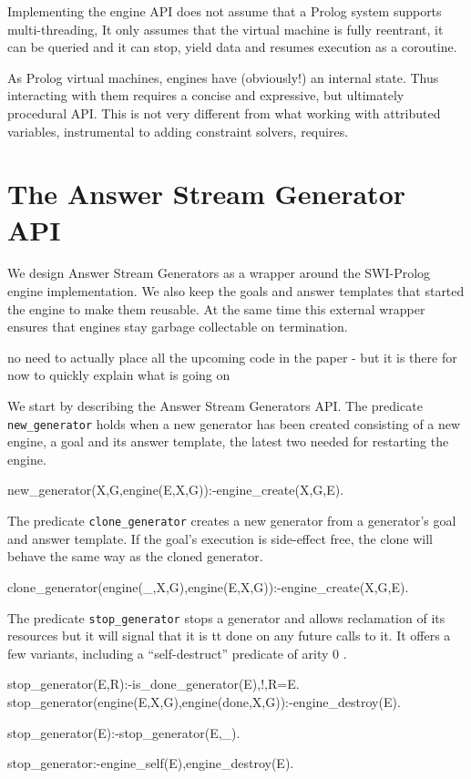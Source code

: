 \documentclass{new_tlp}
\begin{document}
Implementing the engine API does not assume that a Prolog system supports multi-threading, It only assumes that the virtual machine is fully reentrant, it can be queried and it can stop, yield data and resumes execution as a coroutine.

As Prolog virtual machines, engines have (obviously!) an internal state. Thus interacting with them requires a concise and expressive, but ultimately procedural API. This is not very different from what working with attributed variables, instrumental to adding constraint solvers, requires.

\section{The Answer Stream Generator API}

We design Answer Stream Generators as a wrapper around the SWI-Prolog engine implementation.
We also keep the goals and answer templates that started the engine to make them reusable. At the same time this external wrapper ensures that engines stay garbage collectable on termination.


{\Large no need to actually place all the upcoming code in the paper - but it is there for now to quickly explain what is going on}

We start by describing the Answer Stream Generators API.
The predicate {\tt new\_generator} holds when a new generator has been created
consisting of a new engine, a goal and its answer template, the latest two needed
for restarting the engine.
\begin{code}
new_generator(X,G,engine(E,X,G)):-engine_create(X,G,E).
\end{code}

The predicate  {\tt clone\_generator} creates a new generator from a generator's goal and answer template. If the goal's execution is side-effect free, the clone will behave the same way as the cloned generator.
\begin{code}
clone_generator(engine(_,X,G),engine(E,X,G)):-engine_create(X,G,E).
\end{code}

The predicate {\tt stop\_generator} stops a generator and allows reclamation of its resources but it will signal that it is {tt done} on any future calls to it.
It offers a few variants, including a ``self-destruct'' predicate of arity 0 .
\begin{code}
stop_generator(E,R):-is_done_generator(E),!,R=E.
stop_generator(engine(E,X,G),engine(done,X,G)):-engine_destroy(E).

stop_generator(E):-stop_generator(E,_).

stop_generator:-engine_self(E),engine_destroy(E).
\end{code}
\end{document}
